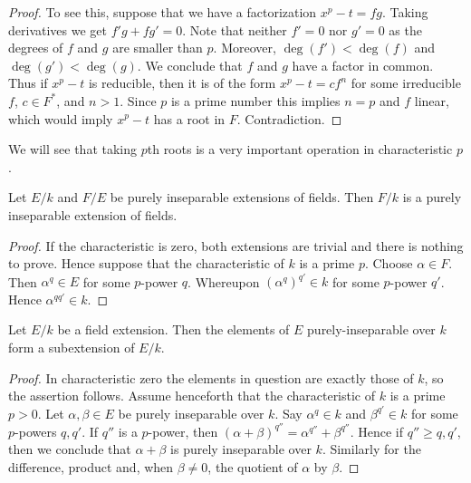 \begin{proof}
To see this, suppose that we have a factorization
$x^p - t = f g$. Taking derivatives we get $f' g + f g' = 0$.
Note that neither $f' = 0$ nor $g' = 0$ as the degrees of $f$ and $g$
are smaller than $p$. Moreover, $\deg(f') < \deg(f)$ and $\deg(g') < \deg(g)$.
We conclude that $f$ and $g$ have a factor in common. Thus if $x^p - t$
is reducible, then it is of the form $x^p - t = c f^n$ for some irreducible
$f$, $c \in F^*$, and $n > 1$. Since $p$ is a prime number this
implies $n = p$ and $f$ linear, which would imply $x^p - t$ has a root
in $F$. Contradiction.
\end{proof}

\noindent
We will see that taking $p$th roots is a very important operation in
characteristic $p$.

\begin{lemma}
\label{lemma-purely-inseparable-permanence}
Let $E/k$ and $F/E$ be purely inseparable extensions of fields. Then $F/k$
is a purely inseparable extension of fields.
\end{lemma}

\begin{proof}
If the characteristic is zero, both extensions are trivial and there is nothing to prove. Hence suppose that the characteristic of $k$ is a prime $p$. Choose $\alpha \in F$. Then
$\alpha^q \in E$ for some $p$-power $q$. Whereupon $(\alpha^q)^{q'} \in k$
for some $p$-power $q'$. Hence $\alpha^{qq'} \in k$.
\end{proof}

\begin{lemma}
\label{lemma-purely-inseparable-elements}
Let $E/k$ be a field extension. Then the elements of $E$ purely-inseparable
over $k$ form a subextension of $E/k$.
\end{lemma}

\begin{proof}
In characteristic zero the elements in question are exactly those of $k$,
so the assertion follows. Assume henceforth that the characteristic of $k$
is a prime $p > 0$.
Let $\alpha, \beta \in E$ be purely inseparable over $k$. Say
$\alpha^q \in k$ and $\beta^{q'} \in k$ for some $p$-powers $q, q'$.
If $q''$ is a $p$-power, then
$(\alpha + \beta)^{q''} = \alpha^{q''} + \beta^{q''}$.
Hence if $q'' \geq q, q'$, then we conclude that $\alpha + \beta$
is purely inseparable over $k$. Similarly for the difference,
product and, when $\beta \not = 0$, the quotient of $\alpha$ by $\beta$.
\end{proof}

